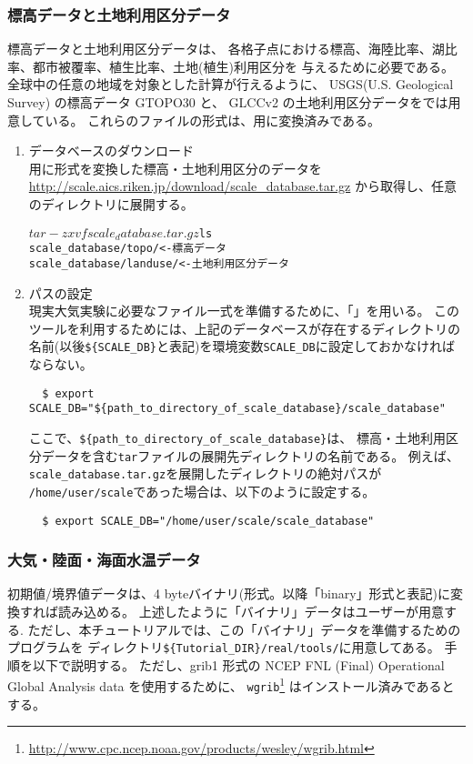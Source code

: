 \subsubsection{標高データと土地利用区分データ}
標高データと土地利用区分データは、
各格子点における標高、海陸比率、湖比率、都市被覆率、植生比率、土地(植生)利用区分を
与えるために必要である。
全球中の任意の地域を対象とした計算が行えるように、
USGS(U.S. Geological Survey) の標高データ GTOPO30 と、
GLCCv2 の土地利用区分データを{\scalerm}では用意している。
これらのファイルの形式は、{\scalerm}用に変換済みである。

\begin{enumerate}
\item データベースのダウンロード\\
\scalerm 用に形式を変換した標高・土地利用区分のデータを
 \url{http://scale.aics.riken.jp/download/scale_database.tar.gz}
から取得し、任意のディレクトリに展開する。
\begin{alltt}
  $ tar -zxvf scale_database.tar.gz
  $ ls
    scale_database/topo/    <- 標高データ
    scale_database/landuse/ <- 土地利用区分データ
\end{alltt}

\item パスの設定\\
現実大気実験に必要なファイル一式を準備するために、「{\makeconftool}」を用いる。
このツールを利用するためには、上記のデータベースが存在するディレクトリの名前(以後\verb|${SCALE_DB}|と表記)を環境変数\verb|SCALE_DB|に設定しておかなければならない。
\begin{verbatim}
  $ export SCALE_DB="${path_to_directory_of_scale_database}/scale_database"
\end{verbatim}
ここで、\verb|${path_to_directory_of_scale_database}|は、
標高・土地利用区分データを含む\verb|tar|ファイルの展開先ディレクトリの名前である。
例えば、\verb|scale_database.tar.gz|を展開したディレクトリの絶対パスが
\verb|/home/user/scale|であった場合は、以下のように設定する。
\begin{verbatim}
  $ export SCALE_DB="/home/user/scale/scale_database"
\end{verbatim}
\end{enumerate}

\subsubsection{大気・陸面・海面水温データ}
初期値/境界値データは、4 byteバイナリ(\grads 形式。以降「binary」形式と表記)に変換すれば読み込める。
上述したように「バイナリ」データはユーザーが用意する.
ただし、本チュートリアルでは、この「バイナリ」データを準備するためのプログラムを
ディレクトリ\verb|${Tutorial_DIR}/real/tools/|に用意してある。
手順を以下で説明する。
ただし、grib1 形式の NCEP FNL (Final) Operational Global Analysis data を使用するために、
\verb|wgrib|\footnote{
\url{http://www.cpc.ncep.noaa.gov/products/wesley/wgrib.html}
}
はインストール済みであるとする。

